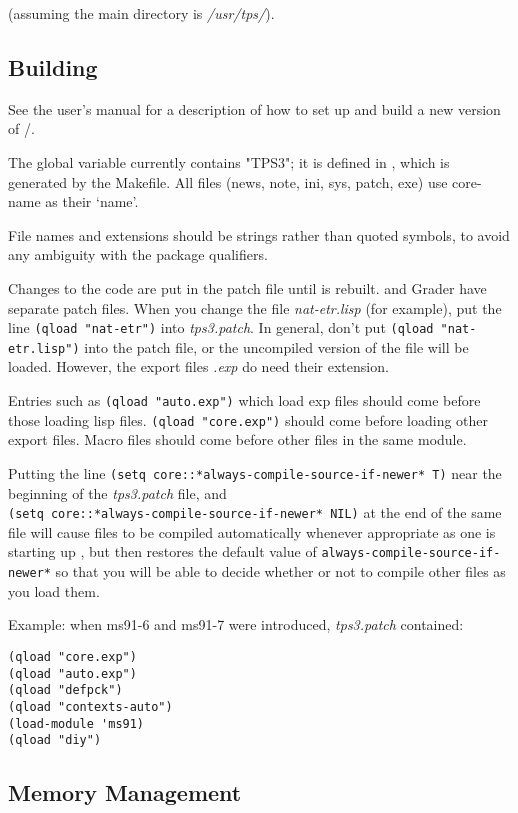 (assuming the main \TPS directory is {\it /usr/tps/}).

\subsection{Building \TPS}
See the user's manual for a description of how to set up and build a
new version of \tps/\ETPS.

The global variable  currently contains "TPS3";
it is defined in {\it {}}, which is generated by the Makefile.
All files (news, note, ini, sys, patch, exe) use core-name as their
`name'.

File names and extensions should be strings rather than
quoted symbols, to avoid any ambiguity with the package qualifiers.

Changes to the code are put in the patch file {\it {}} until 
\TPS is rebuilt. \ETPS and Grader have separate patch files.
When you change the file {\it nat-etr.lisp} (for
example), put the line {\tt (qload "nat-etr")} into {\it tps3.patch}.
In general, don't put {\tt (qload "nat-etr.lisp")} into the patch file, or the
uncompiled version of the file will be loaded. However, the export files
{\it *.exp} do need their extension.

Entries such as {\tt (qload "auto.exp")} which load exp files should
come before those loading lisp files. 
{\tt (qload "core.exp")} should come before loading other export files.
Macro files should come before other files in the same module.

Putting the line
{\tt (setq core::*always-compile-source-if-newer* T)}
near the beginning of the {\it tps3.patch} file, and \\
{\tt (setq core::*always-compile-source-if-newer* NIL)}
at the end of the same file
will cause files to be compiled automatically
whenever appropriate as one is starting up \tps, but then
restores the default value of {\tt *always-compile-source-if-newer*}
so that you will be able to decide whether or not to compile other
files as you load them.

Example: when ms91-6 and ms91-7 were introduced, {\it tps3.patch}
contained:
\begin{verbatim}
(qload "core.exp")
(qload "auto.exp")
(qload "defpck")
(qload "contexts-auto")
(load-module 'ms91)
(qload "diy")
\end{verbatim}

\subsection{Memory Management}

